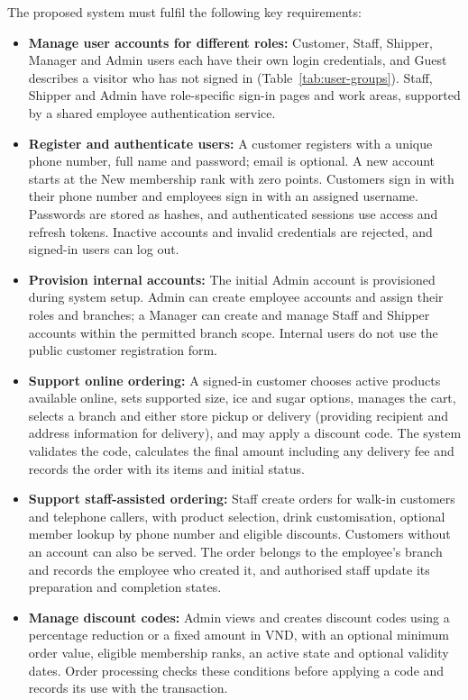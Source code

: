 The proposed system must fulfil the following key requirements:

\begin{itemize}
  \item \textbf{Manage user accounts for different roles:} Customer, Staff, Shipper, Manager and Admin users each have their own login credentials, and Guest describes a visitor who has not signed in (Table~\ref{tab:user-groups}). Staff, Shipper and Admin have role-specific sign-in pages and work areas, supported by a shared employee authentication service.
  \item \textbf{Register and authenticate users:} A customer registers with a unique phone number, full name and password; email is optional. A new account starts at the New membership rank with zero points. Customers sign in with their phone number and employees sign in with an assigned username. Passwords are stored as hashes, and authenticated sessions use access and refresh tokens. Inactive accounts and invalid credentials are rejected, and signed-in users can log out.
  \item \textbf{Provision internal accounts:} The initial Admin account is provisioned during system setup. Admin can create employee accounts and assign their roles and branches; a Manager can create and manage Staff and Shipper accounts within the permitted branch scope. Internal users do not use the public customer registration form.
  \item \textbf{Support online ordering:} A signed-in customer chooses active products available online, sets supported size, ice and sugar options, manages the cart, selects a branch and either store pickup or delivery (providing recipient and address information for delivery), and may apply a discount code. The system validates the code, calculates the final amount including any delivery fee and records the order with its items and initial status.
  \item \textbf{Support staff-assisted ordering:} Staff create orders for walk-in customers and telephone callers, with product selection, drink customisation, optional member lookup by phone number and eligible discounts. Customers without an account can also be served. The order belongs to the employee's branch and records the employee who created it, and authorised staff update its preparation and completion states.
  \item \textbf{Manage discount codes:} Admin views and creates discount codes using a percentage reduction or a fixed amount in VND, with an optional minimum order value, eligible membership ranks, an active state and optional validity dates. Order processing checks these conditions before applying a code and records its use with the transaction.

\end{itemize}
